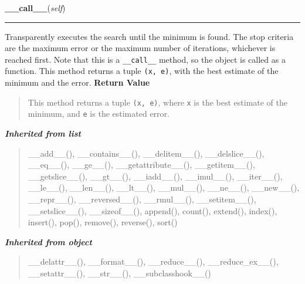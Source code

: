 \hspace{.8\funcindent}\begin{boxedminipage}{\funcwidth}

    \raggedright \textbf{\_\_call\_\_}(\textit{self})

    \vspace{-1.5ex}

    \rule{\textwidth}{0.5\fboxrule}
\setlength{\parskip}{2ex}

Transparently executes the search until the minimum is found. The stop
criteria are the maximum error or the maximum number of iterations,
whichever is reached first. Note that this is a \texttt{\_\_call\_\_} method, so
the object is called as a function. This method returns a tuple
\texttt{(x, e)}, with the best estimate of the minimum and the error.
\setlength{\parskip}{1ex}
      \textbf{Return Value}
    \vspace{-1ex}

      \begin{quote}

This method returns a tuple \texttt{(x, e)}, where \texttt{x} is the best
estimate of the minimum, and \texttt{e} is the estimated error.
      \end{quote}

    \end{boxedminipage}


\large{\textbf{\textit{Inherited from list}}}

\begin{quote}
\_\_add\_\_(), \_\_contains\_\_(), \_\_delitem\_\_(), \_\_delslice\_\_(), \_\_eq\_\_(), \_\_ge\_\_(), \_\_getattribute\_\_(), \_\_getitem\_\_(), \_\_getslice\_\_(), \_\_gt\_\_(), \_\_iadd\_\_(), \_\_imul\_\_(), \_\_iter\_\_(), \_\_le\_\_(), \_\_len\_\_(), \_\_lt\_\_(), \_\_mul\_\_(), \_\_ne\_\_(), \_\_new\_\_(), \_\_repr\_\_(), \_\_reversed\_\_(), \_\_rmul\_\_(), \_\_setitem\_\_(), \_\_setslice\_\_(), \_\_sizeof\_\_(), append(), count(), extend(), index(), insert(), pop(), remove(), reverse(), sort()
\end{quote}

\large{\textbf{\textit{Inherited from object}}}

\begin{quote}
\_\_delattr\_\_(), \_\_format\_\_(), \_\_reduce\_\_(), \_\_reduce\_ex\_\_(), \_\_setattr\_\_(), \_\_str\_\_(), \_\_subclasshook\_\_()
\end{quote}


